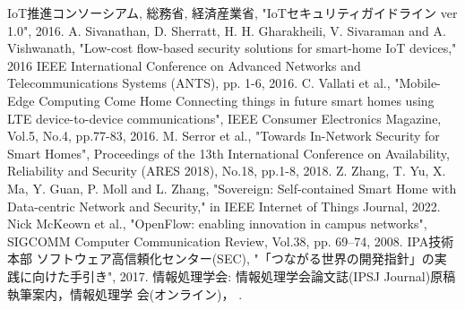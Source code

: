 \documentclass[Japanese]{dicomopapers}
\begin{document}
\begin{thebibliography}{10}
	 IoT推進コンソーシアム, 総務省, 経済産業省, "IoTセキュリティガイドライン ver 1.0", 2016.
	 A. Sivanathan, D. Sherratt, H. H. Gharakheili, V. Sivaraman and A. Vishwanath, "Low-cost flow-based security solutions for smart-home IoT devices," 2016 IEEE International Conference on Advanced Networks and Telecommunications Systems (ANTS), pp. 1-6, 2016.
	 C. Vallati et al., "Mobile-Edge Computing Come Home Connecting things in future smart homes using LTE device-to-device communications", IEEE Consumer Electronics Magazine, Vol.5, No.4, pp.77-83, 2016.
	 M. Serror et al., "Towards In-Network Security for Smart Homes", Proceedings of the 13th International Conference on Availability, Reliability and Security (ARES 2018), No.18, pp.1-8, 2018.
	 Z. Zhang, T. Yu, X. Ma, Y. Guan, P. Moll and L. Zhang, "Sovereign: Self-contained Smart Home with Data-centric Network and Security," in IEEE Internet of Things Journal, 2022.
	 Nick McKeown et al., "OpenFlow: enabling innovation in campus networks", SIGCOMM Computer Communication Review, Vol.38, pp. 69–74, 2008.
	 IPA技術本部 ソフトウェア高信頼化センター(SEC), "「つながる世界の開発指針」の実践に向けた手引き", 2017.
	情報処理学会: 情報処理学会論文誌(IPSJ Journal)原稿執筆案内，情報処理学
	会(オンライン)，
	.
\end{thebibliography}
\end{document}
